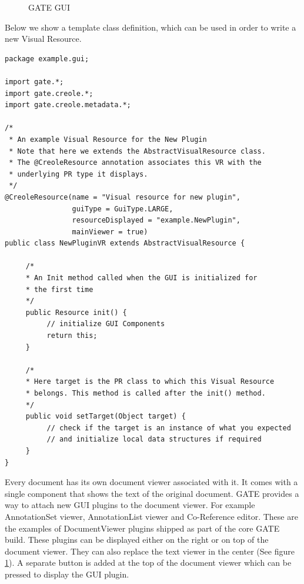 \begin{figure}
\caption{GATE GUI} 
\label{fig:gateguiparts}
\end{figure}


Below we show a template class definition, which can be used in order to write a
new Visual Resource.

\begin{lstlisting}
package example.gui;

import gate.*;
import gate.creole.*;
import gate.creole.metadata.*;

/*
 * An example Visual Resource for the New Plugin
 * Note that here we extends the AbstractVisualResource class.
 * The @CreoleResource annotation associates this VR with the
 * underlying PR type it displays.
 */
@CreoleResource(name = "Visual resource for new plugin",
                guiType = GuiType.LARGE, 
                resourceDisplayed = "example.NewPlugin",
                mainViewer = true)
public class NewPluginVR extends AbstractVisualResource {

     /* 
     * An Init method called when the GUI is initialized for
     * the first time
     */
     public Resource init() {
          // initialize GUI Components
          return this;
     }

     /*
     * Here target is the PR class to which this Visual Resource
     * belongs. This method is called after the init() method.
     */
     public void setTarget(Object target) {
          // check if the target is an instance of what you expected
          // and initialize local data structures if required
     }
}
\end{lstlisting}

Every document has its own document viewer associated with it. It comes with a
single component that shows the text of the original document. GATE provides a
way to attach new GUI plugins to the document viewer. For example AnnotationSet
viewer, AnnotationList viewer and Co-Reference editor. These are the examples of
DocumentViewer plugins shipped as part of the core GATE build. These plugins
can be displayed either on the right or on top of the document viewer. They can also
replace the text viewer in the center (See figure \ref{fig:gateguiparts}). A
separate button is added at the top of the document viewer which can be pressed
to display the GUI plugin.

